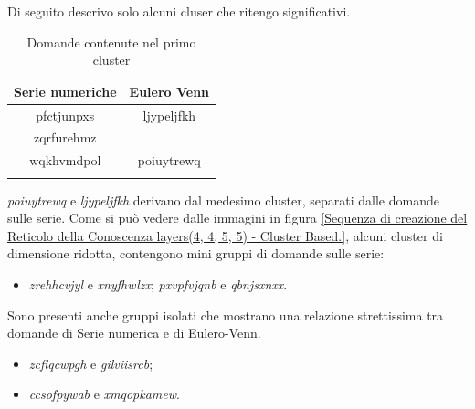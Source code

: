 Di seguito descrivo solo alcuni cluser che ritengo significativi.
\begin{longtable}{|c|c|}
	\hline
	\textbf{Serie numeriche} & \textbf{Eulero Venn} \\\hline\hline
	pfctjunpxs & ljypeljfkh \\
	zqrfurehmz & \\
	wqkhvmdpol & poiuytrewq\\ 
\hline
\caption{Domande contenute nel primo cluster}\label{tab:Domande contenute nel primo cluster (rosa)}
\end{longtable}
\noindent
\textit{poiuytrewq} e \textit{ljypeljfkh} derivano dal medesimo cluster, separati dalle domande sulle serie.
\noindent
Come si può vedere dalle immagini in figura \ref{Sequenza di creazione del Reticolo della Conoscenza layers(4, 4, 5, 5) - Cluster Based.},  alcuni cluster di dimensione ridotta, contengono mini gruppi di domande sulle serie:\\
\begin{itemize}
\item \textit{zrehhcvjyl} e \textit{xnyfhwlzx};
\textit{pxvpfvjqnb} e \textit{qbnjsxnxx}.
\end{itemize}
\noindent
Sono presenti anche gruppi isolati che mostrano una relazione strettissima tra domande di Serie numerica e di Eulero-Venn.
\begin{itemize}
\item \textit{zcflqcwpgh} e \textit{gilviisrcb};
\item \textit{ccsofpywab} e \textit{xmqopkamew}.
\end{itemize}
\noindent

